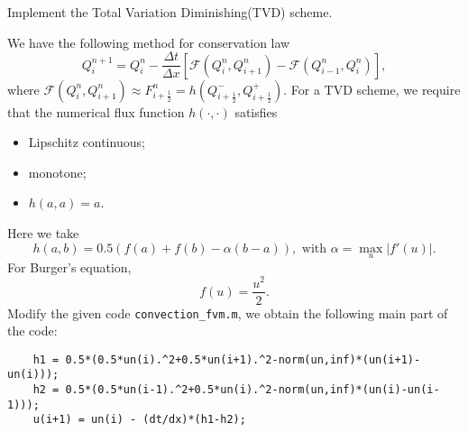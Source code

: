 \begin{pro}
  Implement the Total Variation Diminishing(TVD) scheme.
\end{pro}
\begin{sol}
    We have the following method for conservation law
  \begin{displaymath}
    Q_i^{n+1} = Q_i^n - \frac{\Delta t}{\Delta x}\left[\mathcal{F}(Q_i^n, Q_{i+1}^n) - \mathcal{F}(Q_{i-1}^n, Q_i^n)\right],
  \end{displaymath}
  where $\mathcal{F}(Q_i^n, Q_{i+1}^n) \approx F_{i+\frac{1}{2}}^n =
  h(Q_{i+\frac{1}{2}}^-, Q_{i+\frac{1}{2}}^+)$.
  For a TVD scheme,
  we require that the numerical flux function $h(\cdot,\cdot)$ satisfies
  \begin{itemize}
  \item
    Lipschitz continuous;
  \item
    monotone;
  \item
    $h(a,a)=a$.
  \end{itemize}
  Here we take
  \begin{displaymath}
    h(a,b) = 0.5(f(a)+f(b)-\alpha(b-a)), \text{ with } \alpha = \max_u|f'(u)|.
  \end{displaymath}
  For Burger's equation,
  \begin{displaymath}
    f(u) = \frac{u^2}{2}.
  \end{displaymath}
  Modify the given code \verb|convection_fvm.m|,
  we obtain the following main part of the code:
\begin{verbatim}
    h1 = 0.5*(0.5*un(i).^2+0.5*un(i+1).^2-norm(un,inf)*(un(i+1)-un(i)));
    h2 = 0.5*(0.5*un(i-1).^2+0.5*un(i).^2-norm(un,inf)*(un(i)-un(i-1)));
    u(i+1) = un(i) - (dt/dx)*(h1-h2);
\end{verbatim}
\end{sol}
